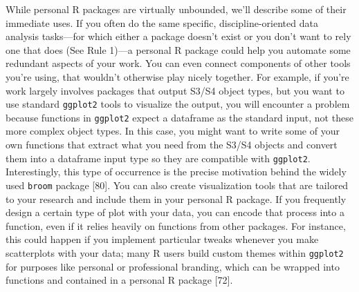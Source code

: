 \documentclass[10pt,letterpaper]{article}
\begin{document}
While personal R packages are virtually unbounded, we'll describe some
of their immediate uses. If you often do the same specific,
discipline-oriented data analysis tasks---for which either a package
doesn't exist or you don't want to rely one that does (See Rule 1)---a
personal R package could help you automate some redundant aspects of
your work. You can even connect components of other tools you're using,
that wouldn't otherwise play nicely together. For example, if you're
work largely involves packages that output S3/S4 object types, but you
want to use standard \texttt{ggplot2} tools to visualize the output, you
will encounter a problem because functions in \texttt{ggplot2} expect a
dataframe as the standard input, not these more complex object types. In
this case, you might want to write some of your own functions that
extract what you need from the S3/S4 objects and convert them into a
dataframe input type so they are compatible with \texttt{ggplot2}.
Interestingly, this type of occurrence is the precise motivation behind
the widely used \texttt{broom} package {[}80{]}. You can also create
visualization tools that are tailored to your research and include them
in your personal R package. If you frequently design a certain type of
plot with your data, you can encode that process into a function, even
if it relies heavily on functions from other packages. For instance,
this could happen if you implement particular tweaks whenever you make
scatterplots with your data; many R users build custom themes within
\texttt{ggplot2} for purposes like personal or professional branding,
which can be wrapped into functions and contained in a personal R
package {[}72{]}.
\end{document}
